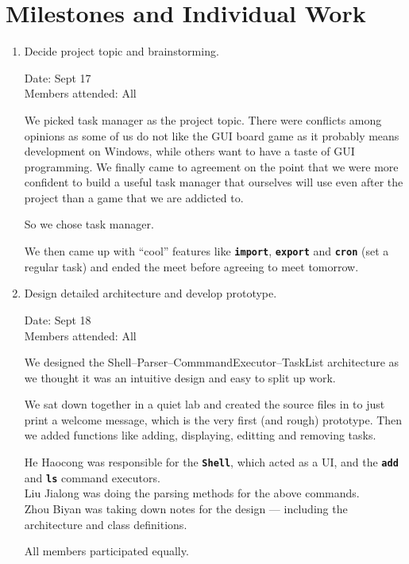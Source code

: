 \documentclass[12pt, a4paper]{article}
\newcommand{\cmdinline}[1]{{\bf \texttt{#1}}}
\begin{document}
\section{Milestones and Individual Work}
\begin{enumerate}
\item Decide project topic and brainstorming.

Date: Sept 17 \\
Members attended: All

We picked task manager as the project topic. There were conflicts among opinions as some of us do not like the GUI board game as it probably means development on Windows, while others want to have a taste of GUI programming. We finally came to agreement on the point that we were more confident to build a useful task manager that ourselves will use even after the project than a game that we are addicted to.

So we chose task manager.

We then came up with ``cool'' features like \cmdinline{import}, \cmdinline{export} and \cmdinline{cron} (set a regular task) and ended the meet before agreeing to meet tomorrow.

\item Design detailed architecture and develop prototype.

Date: Sept 18\\
Members attended: All

We designed the Shell--Parser--CommmandExecutor--TaskList architecture as we thought it was an intuitive design and easy to split up work.

We sat down together in a quiet lab and created the source files in to just print a welcome message, which is the very first (and rough) prototype. Then we added functions like adding, displaying, editting and removing tasks.

He Haocong was responsible for the \cmdinline{Shell}, which acted as a UI, and the \cmdinline{add} and \cmdinline{ls} command executors.\\
Liu Jialong was doing the parsing methods for the above commands.\\
Zhou Biyan was taking down notes for the design --- including the architecture and class definitions.

All members participated equally.


\end{enumerate}
\end{document}
